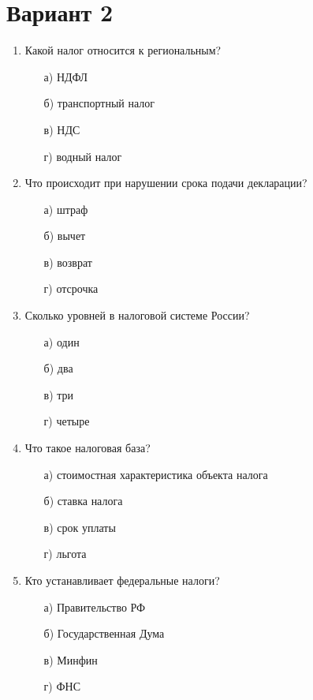 \documentclass[11pt,a4paper]{article}
\begin{document}
\clearpage
\section*{Вариант 2}

\begin{enumerate}
  \item Какой налог относится к региональным?
  \begin{enumerate}
    \item[а)] НДФЛ
    \item[б)] транспортный налог
    \item[в)] НДС
    \item[г)] водный налог
  \end{enumerate}
  \item Что происходит при нарушении срока подачи декларации?
  \begin{enumerate}
    \item[а)] штраф
    \item[б)] вычет
    \item[в)] возврат
    \item[г)] отсрочка
  \end{enumerate}
  \item Сколько уровней в налоговой системе России?
  \begin{enumerate}
    \item[а)] один
    \item[б)] два
    \item[в)] три
    \item[г)] четыре
  \end{enumerate}
  \item Что такое налоговая база?
  \begin{enumerate}
    \item[а)] стоимостная характеристика объекта налога
    \item[б)] ставка налога
    \item[в)] срок уплаты
    \item[г)] льгота
  \end{enumerate}
  \item Кто устанавливает федеральные налоги?
  \begin{enumerate}
    \item[а)] Правительство РФ
    \item[б)] Государственная Дума
    \item[в)] Минфин
    \item[г)] ФНС
  \end{enumerate}
\end{enumerate}
\end{document}
